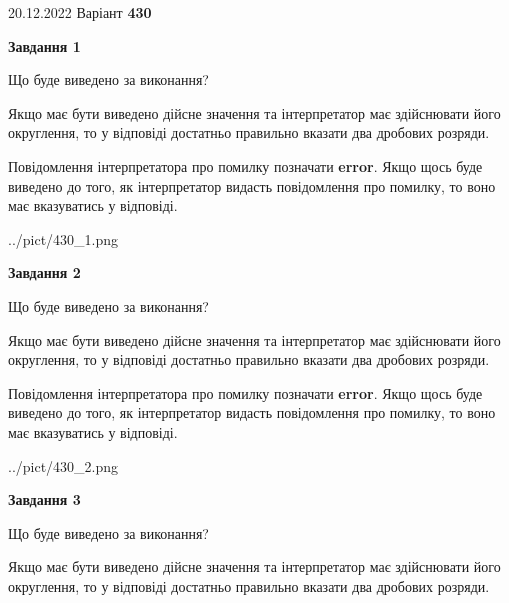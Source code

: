 \documentclass[12pt, ukrainian]{article}
\begin{document}
{20.12.2022 Варіант \No \textbf { 430 }\par}
{
\begin {Large}

{\begin {center}\textbf{Завдання 1}\end {center}}\par
Що буде виведено за виконання? \par

Якщо має бути виведено дійсне значення та інтерпретатор має здійснювати його округлення, 
то у відповіді достатньо правильно вказати два дробових розряди.

Повідомлення інтерпретатора про помилку позначати \textbf{error}.
Якщо щось буде виведено до того, як інтерпретатор видасть повідомлення про помилку, 
то воно має вказуватись у відповіді. \par

\begin{center}
	{../pict/430_1.png}
\end{center}
\newpage

{\begin {center}\textbf{Завдання 2}\end {center}}\par
Що буде виведено за виконання? \par

Якщо має бути виведено дійсне значення та інтерпретатор має здійснювати його округлення, 
то у відповіді достатньо правильно вказати два дробових розряди.

Повідомлення інтерпретатора про помилку позначати \textbf{error}.
Якщо щось буде виведено до того, як інтерпретатор видасть повідомлення про помилку, 
то воно має вказуватись у відповіді. \par

\begin{center}
	{../pict/430_2.png}
\end{center}
\newpage

{\begin {center}\textbf{Завдання 3}\end {center}}\par
Що буде виведено за виконання? \par

Якщо має бути виведено дійсне значення та інтерпретатор має здійснювати його округлення, 
то у відповіді достатньо правильно вказати два дробових розряди.


\end{Large}}
\end{document}
